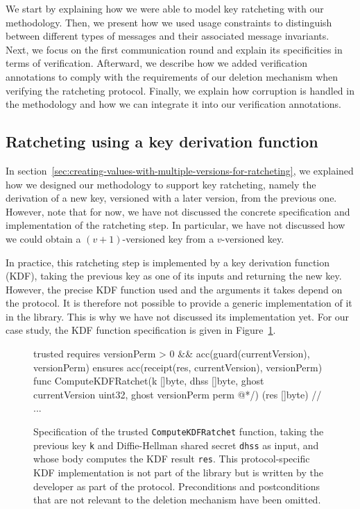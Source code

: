 We start by explaining how we were able to model key ratcheting with our methodology.
Then, we present how we used usage constraints to distinguish between different types of messages and their associated message invariants.
Next, we focus on the first communication round and explain its specificities in terms of verification.
Afterward, we describe how we added verification annotations to comply with the requirements of our deletion mechanism when verifying the ratcheting protocol.
Finally, we explain how corruption is handled in the methodology and how we can integrate it into our verification annotations.

\subsection{Ratcheting using a key derivation function}
\label{sec:ratcheting-using-a-key-derivation-function}

In section~\ref{sec:creating-values-with-multiple-versions-for-ratcheting}, we explained how we designed our methodology to support key ratcheting, namely the derivation of a new key, versioned with a later version, from the previous one.
However, note that for now, we have not discussed the concrete specification and implementation of the ratcheting step. In particular, we have not discussed how we could obtain a $(v+1)$-versioned key from a $v$-versioned key.

In practice, this ratcheting step is implemented by a key derivation function (KDF), taking the previous key as one of its inputs and returning the new key.
However, the precise KDF function used and the arguments it takes depend on the protocol. It is therefore not possible to provide a generic implementation of it in the library. This is why we have not discussed its implementation yet.
For our case study, the KDF function specification is given in Figure~\ref{lst:kdf-ratchet}.

\begin{figure}
    \begin{gobra}
trusted
requires versionPerm > 0 && acc(guard(currentVersion), versionPerm)
ensures  acc(receipt(res, currentVersion), versionPerm)
func ComputeKDFRatchet(k []byte, dhss []byte, ghost currentVersion
    uint32, ghost versionPerm perm @*/) (res []byte) {
    // ...
}
    \end{gobra}
    \caption{Specification of the trusted \texttt{ComputeKDFRatchet} function, taking the previous key \texttt{k} and Diffie-Hellman shared secret \texttt{dhss} as input, and whose body computes the KDF result \texttt{res}. This protocol-specific KDF implementation is not part of the library but is written by the developer as part of the protocol. Preconditions and postconditions that are not relevant to the deletion mechanism have been omitted.}
    \label{lst:kdf-ratchet}
\end{figure}

